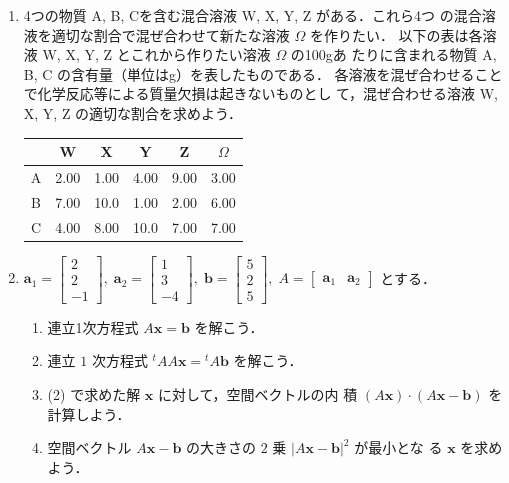 \documentclass[11pt, uplatex, dvipdfmx]{jsarticle}
\begin{document}
\begin{enumerate}
\item 4つの物質 A, B, Cを含む混合溶液 W, X, Y, Z がある．これら4つ
  の混合溶液を適切な割合で混ぜ合わせて新たな溶液 $\Omega$ を作りたい．
  以下の表は各溶液 W, X, Y, Z とこれから作りたい溶液 $\Omega$ の100gあ
  たりに含まれる物質 A, B, C の含有量（単位はg）を表したものである．
  各溶液を混ぜ合わせることで化学反応等による質量欠損は起きないものとし
  て，混ぜ合わせる溶液 W, X, Y, Z の適切な割合を求めよう．
  \begin{table}[h]
    \centering
    \begin{tabular}{ccccc|c}
      & W & X & Y & Z & $\Omega$\\ \hline
      A & 2.00 & 1.00 & 4.00 & 9.00 & 3.00\\ \hline
      B & 7.00 & 10.0 & 1.00 & 2.00 & 6.00\\ \hline  
      C & 4.00 & 8.00 & 10.0 & 7.00 & 7.00\\ 
    \end{tabular}
  \end{table}

  
\item $\bm{a}_1 = \left[
    \begin{array}{r}
      2\\
      2\\
      -1
    \end{array}
  \right], \; \bm{a}_2=\left[
    \begin{array}{r}
      1\\
      3\\
      -4
    \end{array}
  \right], \; \bm{b} = \left[
    \begin{array}{r}
      5\\
      2\\
      5
    \end{array}
  \right], \; A=\left[
    \begin{array}{cc}
      \bm{a}_1 & \bm{a}_2
    \end{array}
  \right]$ とする．
  
  \vspace{1zh}

  
  \begin{enumerate}[(1)]
    \setlength{\itemsep}{1ex}
    
  \item 連立1次方程式 $A\bm{x} = \bm{b}$ を解こう．

  \item 連立 $1$ 次方程式 ${}^{t}A A\bm{x} = {}^{t}A \bm{b}$ を解こう．

  \item (2) で求めた解 $\bm{x}$ に対して，空間ベクトルの内
    積 $(A\bm{x}) \cdot (A\bm{x} -\bm{b})$ を計算しよう．

  \item 空間ベクトル $A\bm{x}-\bm{b}$ の大きさの $2$ 乗 $|A\bm{x} - \bm{b}|^2$ が最小とな
    る $\bm{x}$ を求めよう．
  \end{enumerate}
  
\end{enumerate}
\end{document}
